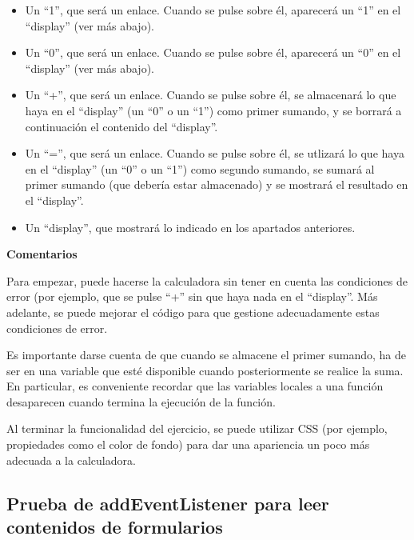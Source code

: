 \begin{itemize}
\item Un ``1'', que será un enlace. Cuando se pulse sobre él, aparecerá un ``1'' en el ``display'' (ver más abajo).
\item Un ``0'', que será un enlace. Cuando se pulse sobre él, aparecerá un ``0'' en el ``display'' (ver más abajo).
\item Un ``+'', que será un enlace. Cuando se pulse sobre él, se almacenará lo que haya en el ``display'' (un ``0'' o un ``1'') como primer sumando, y se borrará a continuación el contenido del ``display''.
\item Un ``='', que será un enlace. Cuando se pulse sobre él, se utlizará lo que haya en el ``display'' (un ``0'' o un ``1'') como segundo sumando, se sumará al primer sumando (que debería estar almacenado) y se mostrará el resultado en el ``display''.
\item Un ``display'', que mostrará lo indicado en los apartados anteriores.
\end{itemize}

\textbf{Comentarios}

Para empezar, puede hacerse la calculadora sin tener en cuenta las condiciones de error (por ejemplo, que se pulse ``+'' sin que haya nada en el ``display''. Más adelante, se puede mejorar el código para que gestione adecuadamente estas condiciones de error.

Es importante darse cuenta de que cuando se almacene el primer sumando, ha de ser en una variable que esté disponible cuando posteriormente se realice la suma. En particular, es conveniente recordar que las variables locales a una función desaparecen cuando termina la ejecución de la función.

Al terminar la funcionalidad del ejercicio, se puede utilizar CSS (por ejemplo, propiedades como el color de fondo) para dar una apariencia un poco más adecuada a la calculadora.



\subsection{Prueba de addEventListener para leer contenidos de formularios}
\label{subsec:eje-js-addeventlistener-form}

